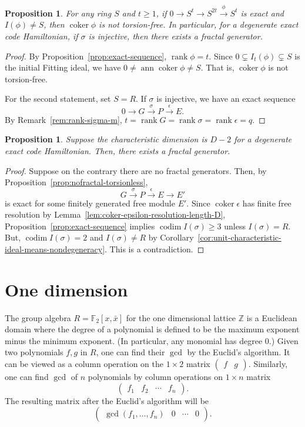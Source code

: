 \documentclass[letterpaper,12pt]{amsart}
\newtheorem{prop}[lem]{Proposition}
\theoremstyle{definition} \newtheorem{defn}{Definition}
\theoremstyle{definition} \newtheorem{rem}{Remark}
\theoremstyle{definition} \newtheorem{example}{Example}
\newcommand{\coker}{\mathop{\mathrm{coker}}}
\newcommand{\ann}{\mathop{\mathrm{ann}}}
\newcommand{\rank}{\mathop{\mathrm{rank}}}
\newcommand{\codim}{\mathop{\mathrm{codim}}}
\newcommand{\FF}{\mathbb{F}}
\begin{document}
\begin{prop}
For any ring $S$ and $t \ge 1$,
if $0 \to S^t \to S^{2t} \xrightarrow{\phi} S^t$ is exact and $I(\phi) \ne S$,
then $\coker \phi$ is not torsion-free.
In particular,
for a degenerate exact code Hamiltonian,
if $\sigma$ is injective, then there exists a fractal generator.
\label{prop:injective-sigma-implies-fractal}
\end{prop}
\begin{proof}
By Proposition~\ref{prop:exact-sequence}, $\rank \phi = t$.
Since $0 \subsetneq I_t(\phi) \subsetneq S$ is the initial Fitting ideal,
we have $0 \ne \ann \coker \phi \ne S$. That is, $\coker \phi$ is not torsion-free.

For the second statement, set $S=R$.
If $\sigma$ is injective, we have an exact sequence
\[
 0 \to G \xrightarrow{\sigma} P \xrightarrow{\epsilon} E .
\]
By Remark~\ref{rem:rank-sigma-m}, $t = \rank G = \rank \sigma = \rank \epsilon = q$.
\end{proof}

\begin{prop}
Suppose the characteristic dimension is $D-2$
for a degenerate exact code Hamiltonian.
Then, there exists a fractal generator.
\label{prop:maximal-characteristic-dimension-means-fractal}
\end{prop}
\begin{proof}
Suppose on the contrary there are no fractal generators.
Then, by Proposition~\ref{prop:nofractal-torsionless},
\[
 G \xrightarrow{\sigma} P \xrightarrow{\epsilon} E \to E'
\]
is exact for some finitely generated free module $E'$.
Since $\coker \epsilon$ has finite free resolution by Lemma~\ref{lem:coker-epsilon-resolution-length-D},
Proposition~\ref{prop:exact-sequence} implies
$\codim I(\sigma) \ge 3$ unless $I(\sigma) = R$.
But, $\codim I(\sigma) = 2$ and $I(\sigma) \ne R$ by 
Corollary~\ref{cor:unit-characteristic-ideal-means-nondegeneracy}.
This is a contradiction.
\end{proof}


\section{One dimension}

The group algebra $R = \FF_2[x,\bar x]$ for the one dimensional lattice $\mathbb{Z}$
is a Euclidean domain
where the degree of a polynomial is defined to be the maximum exponent minus the minimum exponent.
(In particular, any monomial has degree $0$.)
Given two polynomials $f,g$ in $R$, one can find their $\gcd$ by the Euclid's algorithm.
It can be viewed as a column operation on the $1 \times 2$ matrix $\begin{pmatrix} f & g \end{pmatrix}$.
Similarly, one can find $\gcd$ of $n$ polynomials by column operations on $1 \times n$ matrix
\[
 \begin{pmatrix}
  f_1 & f_2 & \cdots & f_n
 \end{pmatrix} .
\]
The resulting matrix after the Euclid's algorithm will be
\[
\begin{pmatrix}
\gcd(f_1,\ldots,f_n) & 0 & \cdots & 0
\end{pmatrix} .
\]
\end{document}
